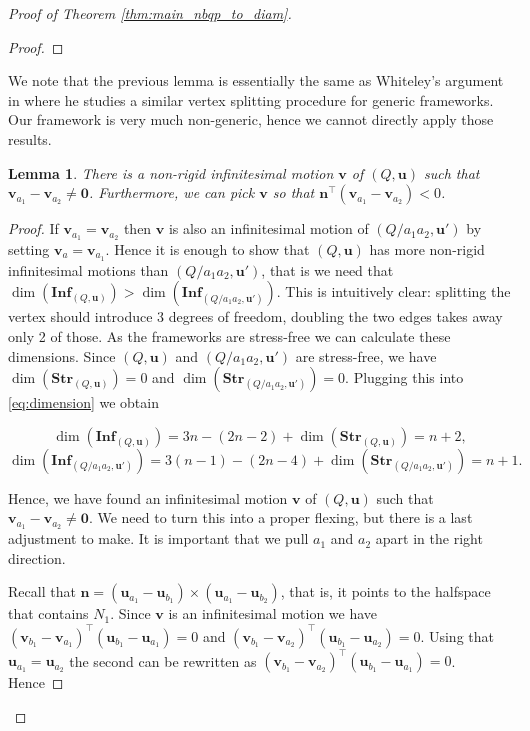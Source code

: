 \documentclass[10pt,a4paper]{article}
\newtheorem{lemma}[theorem]{Lemma}
\newcommand{\vu}[0]{\mathbf{u}}
\newcommand{\vv}[0]{\mathbf{v}}
\newcommand{\vn}[0]{\mathbf{n}}
\begin{document}
\begin{proof}[Proof of Theorem \ref{thm:main_nbqp_to_diam}]
\begin{proof}
    \end{proof}
    We note that the previous lemma is essentially the same as Whiteley's argument in \cite{whiteley1990vertex} where he studies a similar vertex splitting procedure for generic frameworks. Our framework is very much non-generic, hence we cannot directly apply those results. 
     
     \begin{lemma}\label{lem:infinitesimalexists}
         There is a non-rigid infinitesimal motion $\vv$ of $(Q,\vu)$ such that $\vv_{a_1}-\vv_{a_2}\neq \mathbf{0}$. Furthermore, we can pick $\vv$ so that $\vn^\top (\vv_{a_1}-\vv_{a_2})<0$.
     \end{lemma}
    \begin{proof}
        If $\vv_{a_1}=\vv_{a_2}$ then $\vv$ is also an infinitesimal motion of $(Q/a_1a_2,\vu')$ by setting $\vv_a=\vv_{a_1}$. Hence it is enough to show that $(Q,\vu)$ has more non-rigid infinitesimal motions than $(Q/a_1a_2,\vu')$, that is we need that $\dim(\mathbf{Inf}_{(Q,\vu)})>\dim(\mathbf{Inf}_{(Q/a_1a_2,\vu')})$. This is intuitively clear: splitting the vertex should introduce 3 degrees of freedom, doubling the two edges takes away only 2 of those. As the frameworks are stress-free we can calculate these dimensions. Since $(Q,\vu)$ and $(Q/a_1a_2,\vu')$ are stress-free, we have $\dim(\mathbf{Str}_{(Q,\vu)})=0$ and $\dim(\mathbf{Str}_{(Q/a_1a_2,\vu')})=0$. Plugging this into \eqref{eq:dimension} we obtain

     
    \begin{equation*}
        \dim(\mathbf{Inf}_{(Q,\vu)})=3n-(2n-2)+\dim(\mathbf{Str}_{(Q,\vu)})=n+2,
    \end{equation*}
    \begin{equation*}
        \dim(\mathbf{Inf}_{(Q/a_1a_2,\vu')})=3(n-1)-(2n-4)+\dim(\mathbf{Str}_{(Q/a_1a_2,\vu')})=n+1.
    \end{equation*}
    
  
     Hence, we have found an infinitesimal motion $\vv$ of $(Q,\vu)$ such that $\vv_{a_1}-\vv_{a_2}\neq \mathbf{0}$. We need to turn this into a proper flexing, but there is a last adjustment to make. It is important that we pull $a_1$ and $a_2$ apart in the right direction.
    
    Recall that $\vn=(\vu_{a_1}-\vu_{b_1})\times(\vu_{a_1}-\vu_{b_2})$, that is, it points to the halfspace that contains $N_1$. Since $\vv$ is an infinitesimal motion we have $(\vv_{b_1}-\vv_{a_1})^\top(\vu_{b_1}-\vu_{a_1})=0$ and $(\vv_{b_1}-\vv_{a_2})^\top(\vu_{b_1}-\vu_{a_2})=0$. Using that $\vu_{a_1}=\vu_{a_2}$ the second can be rewritten as $(\vv_{b_1}-\vv_{a_2})^\top(\vu_{b_1}-\vu_{a_1})=0$. Hence 


\end{proof}
\end{proof}
\end{document}
